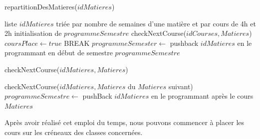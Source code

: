 \documentclass[12pt,a4paper,french]{article}
\begin{document}
\begin{algorithm}
\caption{repartitionDesMatieres($idMatieres$)}
\begin {algorithmic}
\REQUIRE liste $idMatieres$ triée par nombre de semaines d'une matière et par cours de 4h et 2h
\STATE initialisation de $programmeSemestre$
\STATE checkNextCourse($idCourses, Matieres$)
\STATE $coursPlace \leftarrow true$
\STATE BREAK
\ENDIF
\ENDIF
\ENDFOR
{}
\STATE $programmeSemester \leftarrow$ pushback $idMatieres$ en le programmant en début de semestre
\ENDIF
\ENDFOR
\RETURN $programmeSemestre$
\end{algorithmic}
\end{algorithm}


\newpage

\begin{algorithm}
\caption{checkNextCourse($idMatieres, Matieres$)}
\begin {algorithmic}
\STATE checkNextCourse($idMatieres, Matieres$ du $Matieres$ suivant)
\STATE $programmeSemestre \leftarrow$ pushBack $idMatieres$ en le programmant après le cours $Matieres$
\ENDIF
\end{algorithmic}
\end{algorithm}

Après avoir réalisé cet emploi du temps, nous pouvons commencer à placer les cours sur les créneaux des classes concernées.



\end{document}
